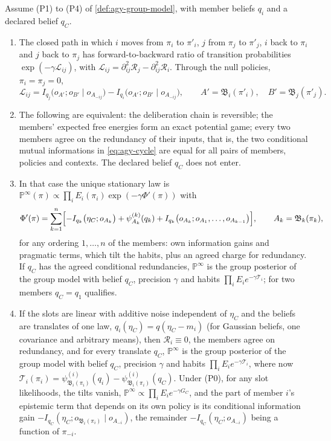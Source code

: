 \begin{theorem}\label{thm:agy-agency}
Assume (P1) to (P4) of \cref{def:agy-group-model}, with member beliefs $q_i$ and a declared belief $q_C$.
\begin{enumerate}
\item[(a)] The closed path in which $i$ moves from $\pi_i$ to $\pi'_i$, $j$ from $\pi_j$ to $\pi'_j$, $i$ back to $\pi_i$ and $j$ back to $\pi_j$ has forward-to-backward ratio of transition probabilities $\exp(-\gamma\mathcal L_{ij})$, with $\mathcal L_{ij}=\partial^2_{ij}\mathcal R_j-\partial^2_{ij}\mathcal R_i$. Through the null policies, $\pi_i=\pi_j=0$,
\begin{equation}\label{eq:agy-cycle}
\mathcal L_{ij}=I_{q_j}\bigl(o_{A'};o_{B'}\mid o_{A_{-ij}}\bigr)-I_{q_i}\bigl(o_{A'};o_{B'}\mid o_{A_{-ij}}\bigr),\qquad A'=\mathfrak B_i(\pi'_i),\quad B'=\mathfrak B_j(\pi'_j).
\end{equation}
\item[(b)] The following are equivalent: the deliberation chain is reversible; the members' expected free energies form an exact potential game; every two members agree on the redundancy of their inputs, that is, the two conditional mutual informations in \eqref{eq:agy-cycle} are equal for all pairs of members, policies and contexts. The declared belief $q_C$ does not enter.
\item[(c)] In that case the unique stationary law is $\mathbb P^\infty(\pi)\propto\prod_iE_i(\pi_i)\exp(-\gamma\Phi'(\pi))$ with
\begin{equation}\label{eq:agy-potential}
\Phi'(\pi)=\sum_{k=1}^n\Bigl[-I_{q_k}\bigl(\eta_C;o_{A_k}\bigr)+\psi^{(k)}_{A_k}(q_k)+I_{q_k}\bigl(o_{A_k};o_{A_1},\dots,o_{A_{k-1}}\bigr)\Bigr],\qquad A_k=\mathfrak B_k(\pi_k),
\end{equation}
for any ordering $1,\dots,n$ of the members: own information gains and pragmatic terms, which tilt the habits, plus an agreed charge for redundancy. If $q_C$ has the agreed conditional redundancies, $\mathbb P^\infty$ is the group posterior of the group model with belief $q_C$, precision $\gamma$ and habits $\prod_iE_ie^{-\gamma\mathcal T_i}$; for two members $q_C=q_1$ qualifies.
\item[(d)] If the slots are linear with additive noise independent of $\eta_C$ and the beliefs are translates of one law, $q_i(\eta_C)=q(\eta_C-m_i)$ (for Gaussian beliefs, one covariance and arbitrary means), then $\mathcal R_i\equiv0$, the members agree on redundancy, and for every translate $q_C$, $\mathbb P^\infty$ is the group posterior of the group model with belief $q_C$, precision $\gamma$ and habits $\prod_iE_ie^{-\gamma\mathcal T_i}$, where now $\mathcal T_i(\pi_i)=\psi^{(i)}_{\mathfrak B_i(\pi_i)}(q_i)-\psi^{(i)}_{\mathfrak B_i(\pi_i)}(q_C)$. Under (P0), for any slot likelihoods, the tilts vanish, $\mathbb P^\infty\propto\prod_iE_ie^{-\gamma G_C}$, and the part of member $i$'s epistemic term that depends on its own policy is its conditional information gain $-I_{q_C}(\eta_C;o_{\mathfrak B_i(\pi_i)}\mid o_{A_{-i}})$, the remainder $-I_{q_C}(\eta_C;o_{A_{-i}})$ being a function of $\pi_{-i}$.

\end{enumerate}
\end{theorem}
